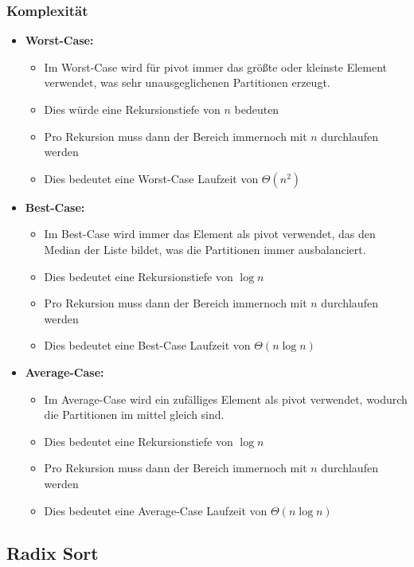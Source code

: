 \documentclass[
../../AuD-Zusammenfassung.tex,
]
{subfiles}
\begin{document}
\subsubsection{Komplexität}
\begin{itemize}
    \item \textbf{Worst-Case:}
    \begin{itemize}
        \item Im Worst-Case wird für pivot immer das größte oder kleinste Element verwendet, was sehr unausgeglichenen Partitionen erzeugt.
        \item Dies würde eine Rekursionstiefe von $n$ bedeuten
        \item Pro Rekursion muss dann der Bereich immernoch mit $n$ durchlaufen werden
        \item Dies bedeutet eine Worst-Case Laufzeit von $\Theta(n^2)$
    \end{itemize}
    \item \textbf{Best-Case:}
    \begin{itemize}
        \item Im Best-Case wird immer das Element als pivot verwendet, das den Median der Liste bildet, was die Partitionen immer ausbalanciert.
        \item Dies bedeutet eine Rekursionstiefe von $\log n$
        \item Pro Rekursion muss dann der Bereich immernoch mit $n$ durchlaufen werden
        \item Dies bedeutet eine Best-Case Laufzeit von $\Theta(n\log n)$
    \end{itemize}
    \item \textbf{Average-Case:}
    \begin{itemize}
        \item Im Average-Case wird ein zufälliges Element als pivot verwendet, wodurch die Partitionen im mittel gleich sind.
        \item Dies bedeutet eine Rekursionstiefe von $\log n$
        \item Pro Rekursion muss dann der Bereich immernoch mit $n$ durchlaufen werden
        \item Dies bedeutet eine Average-Case Laufzeit von $\Theta(n\log n)$
    \end{itemize}
\end{itemize}

\subsection{Radix Sort}
\end{document}
